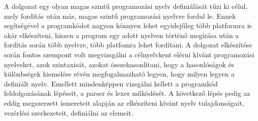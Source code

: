 
A dolgozat egy olyan magas szintű programozási nyelv definiálását tűzi ki célul, mely fordítás után más, magas szintű programozási nyelvre fordul le. Ennek segítségével a programkódot nagyon könnyen lehet egyidejűleg több platformra is akár elkészíteni, hiszen a program egy adott nyelven történő megírása után a fordítás során több nyelvre, több platfomra lehet fordítani.
A dolgozat elkészítése során fontos szempont volt megvizsgálni a célnyelvkent elérni kívánt programozási nyelveket, azok szintaxisát, azokat összehasonlítani, hogy a hasonlóságok és különbségek kiemelése révén megfogalmazható legyen, hogy milyen legyen a definiált nyelv.
Emellett mindenképpen vizsgálni kellett a programkód feldolgozásának lépéseit, a parser és lexer működését. A következő lépés pedig az eddig megszerzett ismereteit alapján az elkészíteni kívánt nyelv tulajdonságait, vezérlési szerkezeteit, definiálni az elemeit.


